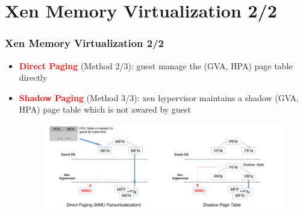 \documentclass[aspectratio=169]{beamer}
\begin{document}

\section{Xen Memory Virtualization 2/2}
\begin{frame}
\frametitle{Xen Memory Virtualization 2/2}
\begin{itemize}
\item \textbf{\textcolor{red}{Direct Paging}} (Method 2/3): guest manage the (GVA, HPA) page table directly
\item \textbf{\textcolor{red}{Shadow Paging}} (Method 3/3): xen hypervisor maintains a shadow (GVA, HPA) page table which is not awared by guest
\begin{figure}
\includegraphics[width=1.0\linewidth]{figures/shadow.pdf}
\end{figure}
\end{itemize}
\end{frame}



\end{document}
